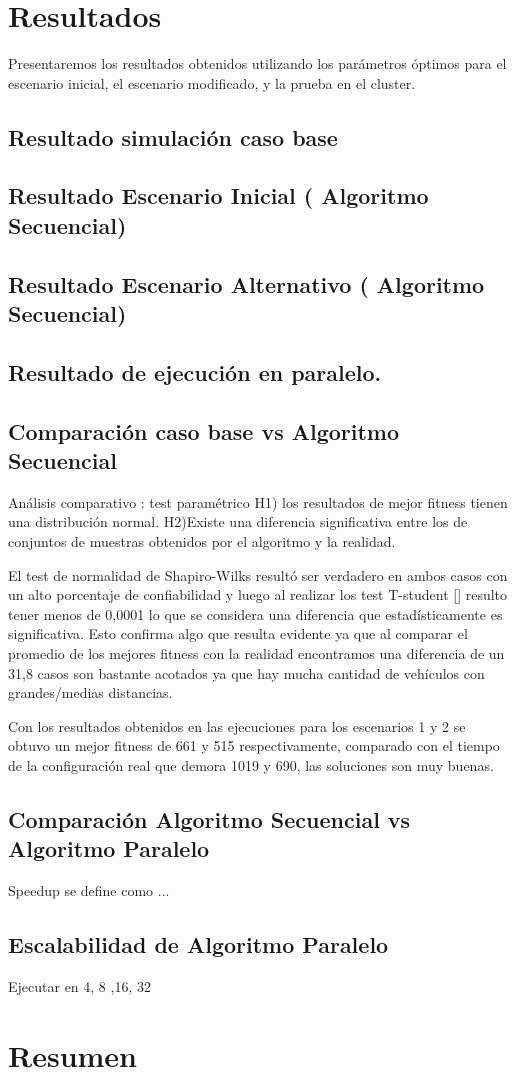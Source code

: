 \section{Resultados}
Presentaremos los resultados obtenidos  utilizando los parámetros óptimos  para el escenario inicial, el escenario modificado, y la prueba en el cluster.

\subsection{Resultado simulación caso base}
\subsection{Resultado Escenario Inicial ( Algoritmo  Secuencial)}
\subsection{Resultado Escenario Alternativo ( Algoritmo  Secuencial)}
\subsection{Resultado de ejecución en paralelo. }

\subsection{Comparación caso base vs Algoritmo Secuencial}
Análisis comparativo : test paramétrico
H1)  los  resultados  de  mejor  fitness  tienen  una distribución normal.
H2)Existe  una  diferencia  significativa  entre  los  de conjuntos  de  muestras  obtenidos  por  el  algoritmo  y  la realidad.

El  test  de  normalidad  de  Shapiro-Wilks  resultó  ser verdadero  en  ambos  casos  con  un  alto  porcentaje  de
confiabilidad y luego al realizar los test T-student [] resulto tener menos de 0,0001 lo que se considera una diferencia que
estadísticamente  es  significativa.  Esto confirma algo que resulta evidente ya que al comparar
el promedio de los mejores fitness con la realidad encontramos
una diferencia de un 31,8%
casos  son  bastante  acotados  ya  que  hay  mucha  cantidad  de
vehículos con grandes/medias distancias.

Con  los  resultados  obtenidos  en  las  ejecuciones  para  los
escenarios  1  y  2  se  obtuvo  un  mejor  fitness  de  661  y  515
respectivamente, comparado con el tiempo de la configuración
real que demora 1019 y 690, las soluciones son muy buenas.



\subsection{Comparación Algoritmo Secuencial vs Algoritmo Paralelo}
Speedup se define como ...

\subsection{Escalabilidad de Algoritmo Paralelo }
Ejecutar en 4, 8 ,16, 32

\section{Resumen}

